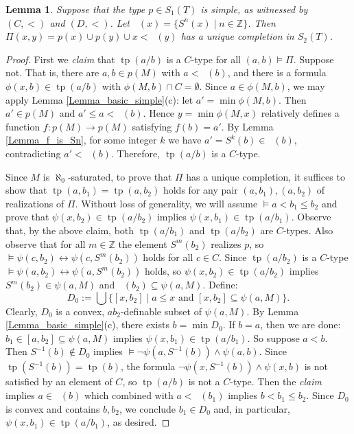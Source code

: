 \documentclass[10pt,a4paper]{amsart}
\newtheorem{Lemma}[Theorem]{Lemma}
\theoremstyle{definition}
\DeclareMathOperator{\cl}{cl_S}
\DeclareMathOperator{\tp}{tp}
\begin{document}
\begin{Lemma}\label{Lemma_x<cl(y)}
Suppose that the type $p\in S_1(T)$ is simple, as witnessed by $(C,<)$  and $(D,<)$. Let $\cl(x)=\{S^n(x)\mid n\in\mathbb Z\}$. Then   $\Pi(x,y)=p(x)\cup p(y)\cup x<\cl(y)$ has a unique completion in $S_2(T)$. 
\end{Lemma}
\begin{proof}First we {\it claim} that $\tp(a/b)$ is a $C$-type for all $(a,b)\models \Pi$. Suppose not. That is, there are $a,b\in p(M)$ with  $a<\cl(b)$, and there is a formula   $\phi(x,b)\in \tp(a/b)$ with $\phi(M,b)\cap C=\emptyset$.  Since $a\in \phi(M,b)$, we may apply Lemma \ref{Lemma_basic_simple}(c): let $a'=\min \phi(M,b)$. Then $a'\in p(M)$ and  $a'\leq a<\cl(b)$. Hence $y=\min\phi(M,x)$ relatively defines a function  $f:p(M)\to p(M)$ satisfying $f(b)=a'$. By Lemma 
\ref{Lemma_f_is_Sn},  for some integer $k$ we have $a'=S^k(b)\in\cl(b)$, contradicting $a'<\cl(b)$. Therefore, $\tp(a/b)$ is a $C$-type. 

Since $M$ is $\aleph_0$-saturated, to prove that $\Pi$ has a unique completion, it suffices to show that $\tp(a,b_1)=\tp(a,b_2)$ holds for any pair $(a,b_1),(a,b_2)$  of realizations of $\Pi$.  Without loss of generality, we will  assume $\models a<b_1\leq b_2$ and  prove that $\psi(x,b_2)\in \tp(a/b_2)$ implies $\psi(x,b_1)\in\tp(a/b_1)$. Observe that, by the above claim, both $\tp(a/b_1)$ and $\tp(a/b_2)$ are $C$-types.
Also observe that for all $m\in\mathbb Z$ the element   $S^m(b_2)$ realizes $p$, so $\models \psi(c,b_2)\leftrightarrow \psi(c,S^m(b_2))$ holds for all $c\in C$. Since $\tp(a/b_2)$ is a $C$-type  $\models \psi(a,b_2)\leftrightarrow \psi(a,S^m(b_2))$ holds, so $\psi(x,b_2)\in\tp(a/b_2)$ implies $S^m(b_2)\in\psi(a,M)$ and $\cl(b_2)\subseteq \psi(a,M)$. 
Define: 
$$D_0:=\bigcup\{[x,b_2]\mid a\leq x \mbox{ and } [x,b_2]\subseteq \psi(a,M)\}.$$ 
Clearly, $D_0$ is a convex, $ab_2$-definable subset of $\psi(a,M)$. By Lemma \ref{Lemma_basic_simple}(c), there exists $b=\min D_0$. If  $b=a$,  then we are done: $b_1\in [a,b_2]\subseteq\psi(a,M)$ implies $\psi(x,b_1)\in\tp(a/b_1)$. So suppose $a<b$. 
Then $S^{-1}(b)\notin D_0$ implies  $\models  \lnot\psi(a,S^{-1}(b))\land \psi(a,b)$. Since $\tp(S^{-1}(b))=\tp(b)$, the formula $\lnot\psi(x,S^{-1}(b))\land \psi(x,b)$ is not satisfied by an element of $C$, so $\tp(a/b)$ is not a $C$-type. 
Then  the {\it claim} implies $a\in \cl(b)$ which combined with $a<\cl(b_1)$ implies $b<b_1\leq b_2$. Since $D_0$ is convex and contains $b,b_2$, we conclude $b_1\in D_0$ and, in particular, $\psi(x,b_1)\in \tp(a/b_1)$, as desired. 
\end{proof}
\end{document}
